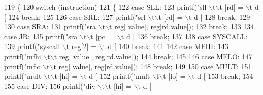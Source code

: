 \begin{DoxyCode}
119 \{
120     \textcolor{keywordflow}{switch} (instruction)
121     \{
122     \textcolor{keywordflow}{case} SLL:
123         printf(\textcolor{stringliteral}{"sll \(\backslash\)t\(\backslash\)t [rd] = \(\backslash\)t d [%
124         \textcolor{keywordflow}{break};
125 
126     \textcolor{keywordflow}{case} SRL:
127         printf(\textcolor{stringliteral}{"srl \(\backslash\)t\(\backslash\)t [rd] = \(\backslash\)t d [%
128         \textcolor{keywordflow}{break};
129 
130     \textcolor{keywordflow}{case} SRA:
131         printf(\textcolor{stringliteral}{"sra \(\backslash\)t\(\backslash\)t reg[%
      value], reg[rd.value]);
132         \textcolor{keywordflow}{break};
133 
134     \textcolor{keywordflow}{case} JR:
135         printf(\textcolor{stringliteral}{"sra \(\backslash\)t\(\backslash\)t [pc] = \(\backslash\)t d [%
136         \textcolor{keywordflow}{break};
137 
138     \textcolor{keywordflow}{case} SYSCALL:
139         printf(\textcolor{stringliteral}{"syscall \(\backslash\)t reg[2] = \(\backslash\)t d [%
140         \textcolor{keywordflow}{break};
141 
142     \textcolor{keywordflow}{case} MFHI:
143         printf(\textcolor{stringliteral}{"mfhi \(\backslash\)t\(\backslash\)t reg[%
      value], reg[rd.value]);
144         \textcolor{keywordflow}{break};
145 
146     \textcolor{keywordflow}{case} MFLO:
147         printf(\textcolor{stringliteral}{"mflo \(\backslash\)t\(\backslash\)t reg[%
      value], reg[rd.value]);
148         \textcolor{keywordflow}{break};
149 
150     \textcolor{keywordflow}{case} MULT:
151         printf(\textcolor{stringliteral}{"mult \(\backslash\)t\(\backslash\)t [hi] = \(\backslash\)t d [%
152         printf(\textcolor{stringliteral}{"mult \(\backslash\)t\(\backslash\)t [lo] = \(\backslash\)t d [%
153         \textcolor{keywordflow}{break};
154 
155     \textcolor{keywordflow}{case} DIV:
156         printf(\textcolor{stringliteral}{"div \(\backslash\)t\(\backslash\)t [hi] = \(\backslash\)t d [%
}}}}}}}}}}
\end{DoxyCode}
